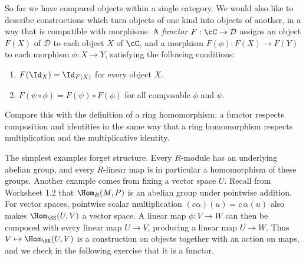 \documentclass[12pt,reqno]{amsart}
\begin{document}
\hrulefill

So far we have compared objects within a single category. We would also like to describe constructions which turn objects of one kind into objects of another, in a way that is compatible with morphisms. A \emph{functor} $F:\cC\to\mathcal D$ assigns an object $F(X)$ of $\mathcal D$ to each object $X$ of $\cC$, and a morphism $F(\phi):F(X)\to F(Y)$ to each morphism $\phi:X\to Y$, satisfying the following conditions:
\begin{enumerate}[label=(\roman*)]
\item $F(\Id_X)=\Id_{F(X)}$ for every object $X$.
\item $F(\psi\circ\phi)=F(\psi)\circ F(\phi)$ for all composable $\phi$ and $\psi$.
\end{enumerate}
Compare this with the definition of a ring homomorphism: a functor respects composition and identities in the same way that a ring homomorphism respects multiplication and the multiplicative identity.

The simplest examples forget structure. Every $R$-module has an underlying abelian group, and every $R$-linear map is in particular a homomorphism of these groups. Another example comes from fixing a vector space $U$. Recall from Worksheet 1.2 that $\Hom_R(M,P)$ is an abelian group under pointwise addition. For vector spaces, pointwise scalar multiplication $(c\alpha)(u)=c\,\alpha(u)$ also makes $\Hom_{\KK}(U,V)$ a vector space. A linear map $\phi:V\to W$ can then be composed with every linear map $U\to V$, producing a linear map $U\to W$. Thus $V\mapsto\Hom_{\KK}(U,V)$ is a construction on objects together with an action on maps, and we check in the following exercise that it is a functor.

\hrulefill
\end{document}
